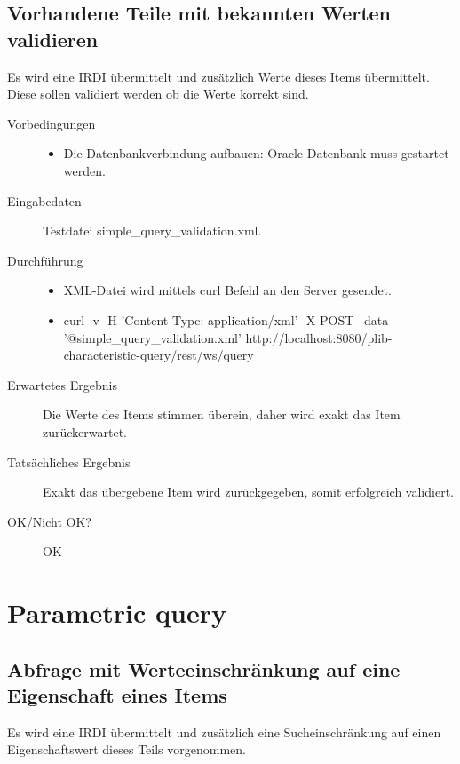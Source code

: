 \subsection{Vorhandene Teile mit bekannten Werten validieren}

Es wird eine IRDI übermittelt und zusätzlich Werte dieses Items übermittelt. Diese sollen validiert werden ob die Werte korrekt sind. 

\begin{description}
\item[Vorbedingungen] 
  \begin{itemize}
   \item Die Datenbankverbindung aufbauen: Oracle Datenbank muss gestartet werden.
  \end{itemize}
\item[Eingabedaten] Testdatei simple\_query\_validation.xml. 
\item[Durchführung]
   \begin{itemize}
   \item XML-Datei wird mittels curl Befehl an den Server gesendet.
   \item curl -v -H 'Content-Type: application/xml' -X POST --data '@simple\_query\_validation.xml' http://localhost:8080/plib-characteristic-query/rest/ws/query
  \end{itemize}
\item[Erwartetes Ergebnis] Die Werte des Items stimmen überein, daher wird exakt das Item zurückerwartet.  
\item[Tatsächliches Ergebnis] Exakt das übergebene Item wird zurückgegeben, somit erfolgreich validiert. 
\item[OK/Nicht OK?] OK
\end{description}

\section{Parametric query}

\subsection{Abfrage mit Werteeinschränkung auf eine Eigenschaft eines Items}

Es wird eine IRDI übermittelt und zusätzlich eine Sucheinschränkung auf einen Eigenschaftswert dieses Teils vorgenommen. 

